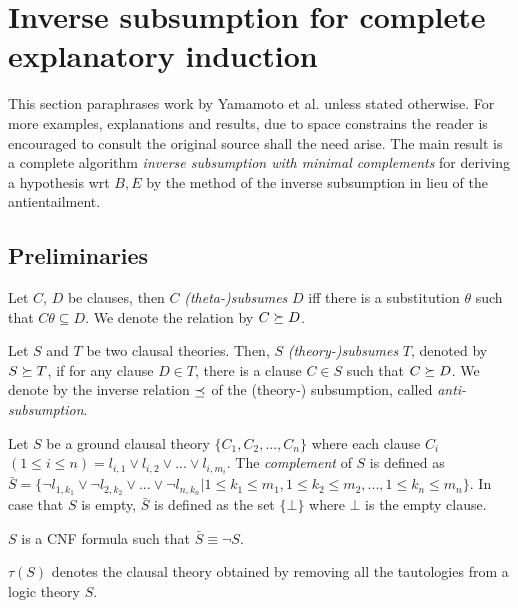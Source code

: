 \section{Inverse subsumption for complete explanatory induction\cite{yamamoto2012inverse}}
This section paraphrases work by Yamamoto et al. \cite{yamamoto2012inverse} unless stated otherwise. For more examples, explanations and results, due to space constrains the reader is encouraged to consult the original source shall the need arise. The main result is a complete algorithm \emph{inverse subsumption with minimal complements} for deriving a hypothesis wrt $B, E$ by the method of the inverse subsumption in lieu of the antientailment.

\subsection{Preliminaries}\label{subsec:preliminaries}
\begin{defn}
Let $C$, $D$ be clauses, then $C$ \emph{(theta-)subsumes} $D$ iff there is a substitution $\theta$ such that $C \theta \subseteq D$. We denote the relation by $C \succeq D$.
\end{defn}

\begin{defn}\label{definition_theory_subsumption}
Let $S$ and $T$ be two clausal theories. Then, $S$ \emph{(theory-)subsumes} $T$, denoted by $S \succeq T$, if for any clause $D \in T$, there is a clause $C \in S$ such
that $C \succeq D$. We denote by the inverse relation $\preceq$ of the (theory-) subsumption, called \emph{anti-subsumption}.
\end{defn}

\begin{defn}
Let $S$ be a ground clausal theory $\{C_1, C_2,... ,C_n\}$ where each clause $C_i$ $(1 \le i \le n)= l_{i,1} \lor l_{i,2} \lor... \lor l_{i,m_i}$.
The \emph{complement} of $S$ is defined as
\\$\bar{S} = \{\neg l_{1,k_1} \lor \neg l_{2,k_2} \lor... \lor \neg l_{n,k_n} |
1 \le k_1 \le m_1 , 1 \le k_2 \le m_2,..., 1 \le k_n \le m_n\}$.
In case that $S$ is empty, $\bar{S}$ is defined as the set $\{\bot\}$ where $\bot$ is the empty clause.
\end{defn}

\begin{remark}
$S$ is a CNF formula such that $\bar{S} \equiv \neg S$.
\end{remark}

\begin{defn}
\emph{$\tau(S)$} denotes the clausal theory obtained by removing all the tautologies from a logic theory $S$.
\end{defn}

